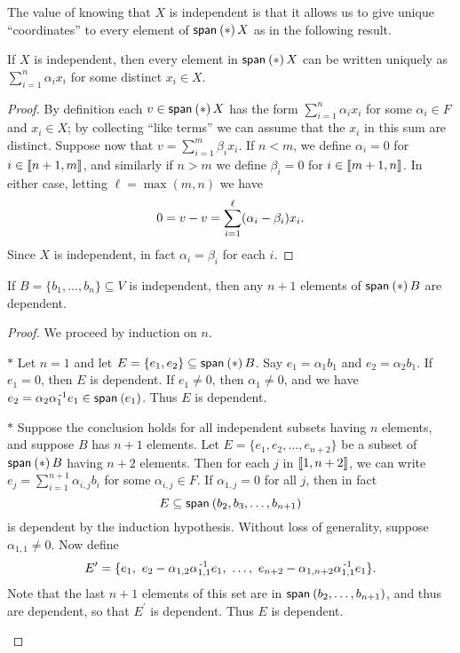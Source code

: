 \documentclass{memoir}
\begin{document}
The value of knowing that $X$ is independent is that it allows us to give unique ``coordinates'' to every element of $\operatorname{\mathsf{span}}_{}\left(*\right){X}$ as in the following result.

\begin{prp}
If $X$ is independent, then every element in $\operatorname{\mathsf{span}}_{}\left(*\right){X}$ can be written uniquely as $\sum_{i=1}^n \alpha_i x_i$ for some distinct $x_i \in X$.
\end{prp}

\begin{proof}
By definition each $v \in \operatorname{\mathsf{span}}_{}\left(*\right){X}$ has the form $\sum_{i=1}^n \alpha_i x_i$ for some $\alpha_i \in F$ and $x_i \in X$; by collecting ``like terms'' we can assume that the $x_i$ in this sum are distinct. Suppose now that $v = \sum_{i=1}^m \beta_i x_i$. If $n < m$, we define $\alpha_i = 0$ for $i \in \llbracket n+1, m \rrbracket$, and similarly if $n > m$ we define $\beta_i = 0$ for $i \in \llbracket m+1, n \rrbracket$. In either case, letting $\ell = \max(m,n)$ we have \[0 = v - v = \sum_{i=1}^{\mathclap{\ell}} (\alpha_i - \beta_i) x_i. \] Since $X$ is independent, in fact $\alpha_i = \beta_i$ for each $i$.
\end{proof}

\begin{prp}
If $B = \{b_1,\ldots,b_n\} \subseteq V$ is independent, then any $n+1$ elements of $\operatorname{\mathsf{span}}_{}\left(*\right){B}$ are dependent.
\end{prp}

\begin{proof}
We proceed by induction on $n$.
\begin{enumerate*}
\item[$\ast$] Let $n = 1$ and let $E = \{e_1,e_2\} \subseteq \operatorname{\mathsf{span}}_{}\left(*\right){B}$. Say $e_1 = \alpha_1 b_1$ and $e_2 = \alpha_2 b_1$. If $e_1 = 0$, then $E$ is dependent. If $e_1 \neq 0$, then $\alpha_1 \neq 0$, and we have $e_2 = \alpha_2 \alpha_1^{{\,\text{-}1}} e_1 \in \operatorname{\mathsf{span}}_{}\left(e_1\right)$. Thus $E$ is dependent.
\item[$\ast$] Suppose the conclusion holds for all independent subsets having $n$ elements, and suppose $B$ has $n+1$ elements. Let $E = \{e_1,e_2,\ldots,e_{n+2}\}$ be a subset of $\operatorname{\mathsf{span}}_{}\left(*\right){B}$ having $n+2$ elements. Then for each $j$ in $\llbracket 1, n+2 \rrbracket$, we can write $e_j = \sum_{i=1}^{n+1} \alpha_{i,j} b_i$ for some $\alpha_{i,j} \in F$. If $\alpha_{1,j} = 0$ for all $j$, then in fact \[ E \subseteq \operatorname{\mathsf{span}}_{}\left(b_2,b_3,\ldots,b_{n+1}\right) \] is dependent by the induction hypothesis. Without loss of generality, suppose $\alpha_{1,1} \neq 0$. Now define \[ E^\prime = \{e_1,\ e_2 - \alpha_{1,2}\alpha_{1,1}^{{\,\text{-}1}} e_1,\ \ldots,\ e_{n+2} - \alpha_{1,n+2} \alpha_{1,1}^{{\,\text{-}1}} e_1 \}. \] Note that the last $n+1$ elements of this set are in $\operatorname{\mathsf{span}}_{}\left(b_2,\ldots,b_{n+1}\right)$, and thus are dependent, so that $E^\prime$ is dependent. Thus $E$ is dependent. \qedhere
\end{enumerate*}
\end{proof}
\end{document}

